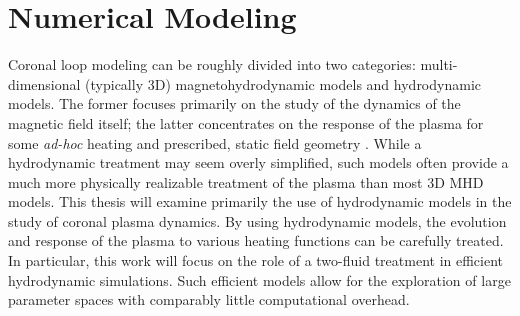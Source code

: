 \chapter{Numerical Modeling}
\label{ch:numerical}
%
\par Coronal loop modeling can be roughly divided into two categories: multi-dimensional (typically 3D) magnetohydrodynamic models and hydrodynamic models. The former focuses primarily on the study of the dynamics of the magnetic field itself; the latter concentrates on the response of the plasma for some \textit{ad-hoc} heating and prescribed, static field geometry \citep{bradshaw_influence_2013}. While a hydrodynamic treatment may seem overly simplified, such models often provide a much more physically realizable treatment of the plasma than most 3D MHD models. This thesis will examine primarily the use of hydrodynamic models in the study of coronal plasma dynamics. By using hydrodynamic models, the evolution and response of the plasma to various heating functions can be carefully treated. In particular, this work will focus on the role of a two-fluid treatment in efficient hydrodynamic simulations. Such efficient models allow for the exploration of large parameter spaces with comparably little computational overhead.
%
